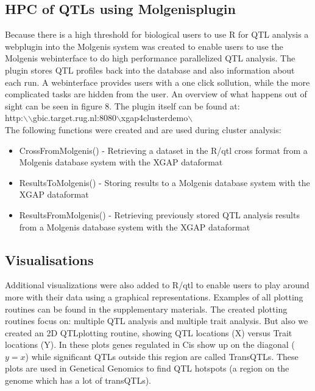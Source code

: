 \subsection{HPC of QTLs using Molgenisplugin}
Because there is a high threshold for biological users to use R for QTL analysis a webplugin into the Molgenis system was created to enable users to 
use the Molgenis webinterface to do high performance parallelized QTL analysis. The plugin stores QTL profiles back into the database and also information about each run.
A webinterface provides users with a one click sollution, while the more complicated tasks are hidden from the user. 
An overview of what happens out of sight can be seen in figure 8.
The plugin itself can be found at:
\\
http:$\backslash$$\backslash$gbic.target.rug.nl:8080$\backslash$xgap4clusterdemo$\backslash$
\\
The following functions were created and are used during cluster analysis:
\begin{itemize}
\item CrossFromMolgenis() - Retrieving a dataset in the R/qtl cross format from a Molgenis database system with the XGAP dataformat
\item ResultsToMolgenis() - Storing results to a Molgenis database system with the XGAP dataformat
\item ResultsFromMolgenis() - Retrieving previously stored QTL analysis results from a Molgenis database system with the XGAP dataformat
\end{itemize}
\subsection{Visualisations}
Additional visualizations were also added to R/qtl to enable users to play around more with their data using a graphical representations.
Examples of all plotting routines can be found in the supplementary materials. The created plotting routines focus on: 
multiple QTL analysis and multiple trait analysis. But also we created an 2D QTLplotting routine, showing QTL locations (X) versus Trait locations (Y).
In these plots genes regulated in Cis show up on the diagonal ($y=x$) while significant QTLs outside this region are called TransQTLs. These plots are used in Genetical Genomics to find QTL hotspots (a region on the genome which has a lot of transQTLs).

